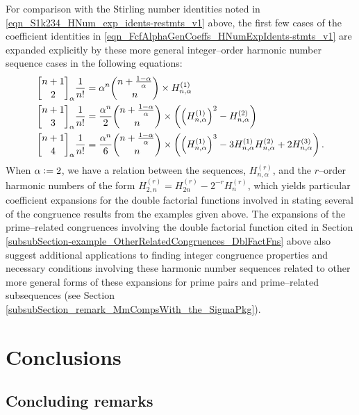 \documentclass[12pt,reqno]{article}
\numberwithin{sfootnote}{section}
\numberwithin{equation}{section}
\theoremstyle{DefaultTheoremStyle}
\theoremstyle{definition}
\newcommand{\defequals}{\ensuremath{\vcentcolon=}}
\newcommand{\gkpSI}[2]{\ensuremath{\genfrac{\lbrack}{\rbrack}{0pt}{}{#1}{#2}}}
\newcommand{\FcfII}[3]{\ensuremath{\gkpSI{#2}{#3}_{#1}}}
\begin{document}
For comparison with the Stirling number identities noted in 
\eqref{eqn_S1k234_HNum_exp_idents-restmts_v1} above, the 
first few cases of the coefficient identities in 
\eqref{eqn_FcfAlphaGenCoeffs_HNumExpIdents-stmts_v1} 
are expanded explicitly by these more general integer--order 
harmonic number sequence cases in the following equations: 
\begin{align*} 
\FcfII{\alpha}{n+1}{2} \frac{1}{n!} & = 
     \alpha^{n} \binom{n+\frac{1-\alpha}{\alpha}}{n} \times 
     H_{n,\alpha}^{(1)} \\ 
\FcfII{\alpha}{n+1}{3} \frac{1}{n!} & = 
     \frac{\alpha^{n}}{2} \binom{n+\frac{1-\alpha}{\alpha}}{n} \times \left( 
     \left(H_{n,\alpha}^{(1)}\right)^{2} - H_{n,\alpha}^{(2)} 
     \right) \\ 
\FcfII{\alpha}{n+1}{4} \frac{1}{n!} & = 
     \frac{\alpha^{n}}{6} \binom{n+\frac{1-\alpha}{\alpha}}{n} \times \left( 
     \left(H_{n,\alpha}^{(1)}\right)^{3} - 
     3 H_{n,\alpha}^{(1)} H_{n,\alpha}^{(2)} + 
     2 H_{n,\alpha}^{(3)} 
     \right). 
\end{align*} 
When $\alpha \defequals 2$, we have a relation between the 
sequences, $H_{n,\alpha}^{(r)}$, and the $r$--order harmonic numbers of the 
form $H_{2,n}^{(r)} = H_{2n}^{(r)} - 2^{-r} H_n^{(r)}$, which yields 
particular coefficient expansions for the double factorial 
functions involved in stating several of the 
congruence results from the examples given above. 
The expansions of the prime--related congruences involving the 
double factorial function cited in 
Section \ref{subsubSection-example_OtherRelatedCongruences_DblFactFns} 
above also suggest additional applications to finding 
integer congruence properties and necessary conditions 
involving these harmonic number sequences related to other more general 
forms of these expansions for prime pairs and prime--related subsequences 
(see 
Section \ref{subsubSection_remark_MmCompsWith_the_SigmaPkg}). 

\section{Conclusions} 
\label{Section_ConcludingRemarks} 

\subsection{Concluding remarks} 
\end{document}
